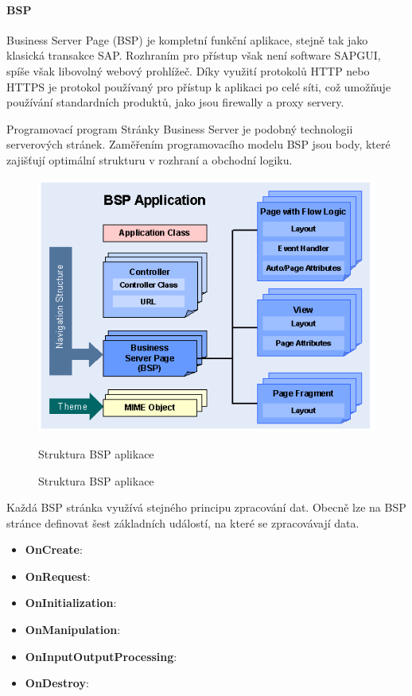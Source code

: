 \documentclass[thesis=M,czech]{FITthesis}[2012/06/26]
\begin{document}
\paragraph{BSP} Business Server Page (BSP) je kompletní funkční aplikace, stejně tak jako klasická transakce SAP. Rozhraním pro přístup však není software SAPGUI, spíše však libovolný webový prohlížeč. Díky využití protokolů HTTP nebo HTTPS je protokol používaný pro přístup k aplikaci po celé síti, což umožňuje používání standardních produktů, jako jsou firewally a proxy servery.

Programovací program Stránky Business Server je podobný technologii serverových stránek. Zaměřením programovacího modelu BSP jsou body, které zajišťují optimální strukturu v rozhraní a obchodní logiku.

\begin{figure}[H]
	\centering
	\includegraphics[width=1\textwidth]{images/bsp.png}
	\caption{Struktura BSP aplikace}
	\label{img:bsp_structure}
	\small
	Struktura BSP aplikace
\end{figure}

Každá BSP stránka využívá stejného principu zpracování dat. Obecně lze na BSP stránce definovat šest základních událostí, na které se zpracovávají data. 
\begin{itemize}
	\item
	\textbf{OnCreate}:
	\item
	\textbf{OnRequest}:
	\item
	\textbf{OnInitialization}:
	\item
	\textbf{OnManipulation}:
	\item
	\textbf{OnInputOutputProcessing}:
	\item
	\textbf{OnDestroy}:
\end{itemize} 
\end{document}
